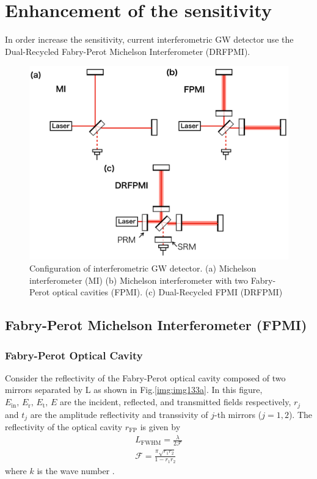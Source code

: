 \newpage
\section{Enhancement of the sensitivity}
In order increase the sensitivity, current interferometric GW detector use the Dual-Recycled Fabry-Perot Michelson Interferometer (DRFPMI). 

\begin{figure}[t]
  \begin{center}   
    \includegraphics[width=14cm]{./img_chap1/img133.png}
    \caption{Configuration of interferometric GW detector. (a) Michelson interferometer (MI) (b) Michelson interferometer with two Fabry-Perot optical cavities (FPMI). (c) Dual-Recycled FPMI (DRFPMI)} \label{img:img133}
  \end{center}
\end{figure}


\subsection{Fabry-Perot Michelson Interferometer (FPMI)}

\subsubsection{Fabry-Perot Optical Cavity}
Consider the reflectivity of the Fabry-Perot optical cavity composed of two mirrors separated by L as shown in Fig.\ref{img:img133a}. In this figure, $E_{\mathrm{in}},\,E_{\mathrm{r}},\,E_{\mathrm{t}},\,E$ are the incident, reflected, and transmitted fields respectively, $r_{j}$ and $t_{j}$ are the amplitude reflectivity and transsivity of $j$-th mirrors ($j=1,2$). The reflectivity of the optical cavity $r_\mathrm{{FP}}$ is given by
\begin{eqnarray}
  L_{\mathrm{FWHM}} = \frac{\lambda}{2\mathcal{F}} \\
  \mathcal{F}=\frac{\pi \sqrt{r_{1} r_{2}}}{1-r_{1} r_{2}}
\end{eqnarray}
where $k$ is the wave number \cite{izumi2012multi}.



